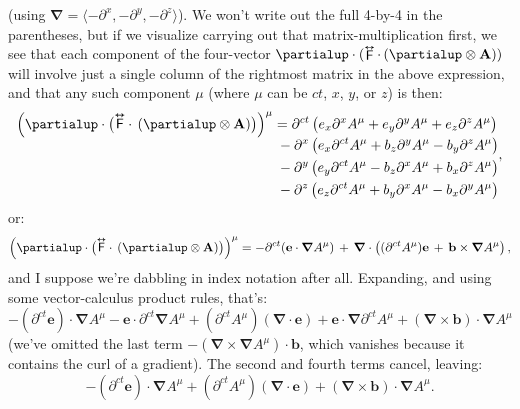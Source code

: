 \documentclass[12pt]{article}
\renewcommand{\vv}[1]{\mathbf{#1}}
\newcommand{\del}{\boldsymbol{\nabla}}
\newcommand{\tightoverset}[2]{%
  \mathop{#2}\limits^{\vbox to -.5ex{\kern-0.75ex\hbox{$#1$}\vss}}}
\newcommand{\inlinedy}[1]{\tightoverset{\text{\tiny$\bm\leftrightarrow$}}{#1}}
\newcommand{\capdy}[1]{ \overset{ \text{\tiny$\bm\leftrightarrow$} }{\vphantom{\text{\small{A}}}\smash{#1}} }
\begin{document}
(using $\del = \langle - \partial^x , - \partial^y , - \partial^z \rangle$). We won't write out the full 4-by-4 in the parentheses, but if we visualize carrying out that matrix-multiplication first, we see that each component of the four-vector $\partialup \cdot (\inlinedy{\mathsf{F}} \cdot \, ( \partialup \otimes \vv A ))$ will involve just a single column of the rightmost matrix in the above expression, and that any such component $\mu$ (where $\mu$ can be $ct$, $x$, $y$, or $z$) is then:
\begin{equation*}
\begin{split}
\Big( \partialup \cdot \big( \capdy{\mathsf{F}} \cdot \, ( \partialup \otimes \vv A ) \big) \Big)^{\mu} &= \partial^{ct} \, \bigl( e_x \partial^x A^{\mu} + e_y \partial^y A^{\mu} + e_z \partial^z A^{\mu} \bigr) \\[-.9ex]
& \; - \partial^x \left( e_x \partial^{ct} A^{\mu} + b_z \partial^y A^{\mu} - b_y \partial^z A^{\mu} \right) \\
& \; - \partial^y \left( e_y \partial^{ct} A^{\mu} - b_z \partial^x A^{\mu} + b_x \partial^z A^{\mu} \right) \\
& \; - \partial^z \left( e_z \partial^{ct} A^{\mu} + b_y \partial^x A^{\mu} - b_x \partial^y A^{\mu} \right)
\end{split},
\end{equation*}
or:
\begin{equation*}
\Big( \partialup \cdot \big( \capdy{\mathsf{F}} \cdot \, ( \partialup \otimes \vv A ) \big) \Big)^{\mu} = - \partial^{ct} ( \vv e \cdot \del A^{\mu} ) \, + \, \del \cdot \left( (\partial^{ct} A^{\mu}) \vv e \, + \, \vv b \times \del A^{\mu} \right) ,
\end{equation*}
and I suppose we're dabbling in index notation after all. Expanding, and using some vector-calculus product rules, that's:
\begin{equation*}
-(\partial^{ct} \vv e) \cdot \del A^{\mu} - \vv e \cdot \partial^{ct} \del A^{\mu} + (\partial^{ct} A^{\mu})(\del \cdot \vv e) + \vv e \cdot \del \partial^{ct} A^{\mu} + (\del \times \vv b) \cdot \del A^{\mu}
\end{equation*}
(we've omitted the last term $ - (\del \times \del A^{\mu}) \cdot \vv b
$, which vanishes because it contains the curl of a gradient). The second and fourth terms cancel, leaving:
\begin{equation*}
-(\partial^{ct} \vv e) \cdot \del A^{\mu} + (\partial^{ct} A^{\mu})(\del \cdot \vv e) + (\del \times \vv b) \cdot \del A^{\mu}.
\end{equation*}
\end{document}
